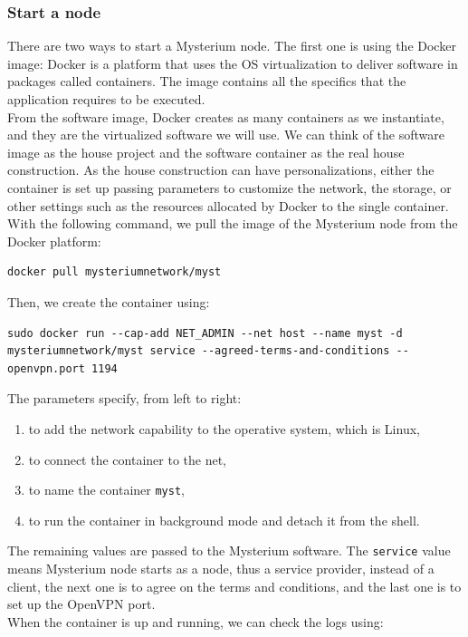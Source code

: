 \documentclass[12pt]{article}
\begin{document}
	\subsubsection{Start a node}
	There are two ways to start a Mysterium node. The first one is using the Docker image: Docker is a platform that uses the OS virtualization to deliver software in packages called containers. The image contains all the specifics that the application requires to be executed.\\
	From the software image, Docker creates as many containers as we instantiate, and they are the virtualized software we will use.  We can think of the software image as the house project and the software container as the real house construction. As the house construction can have personalizations, either the container is set up passing parameters to customize the network, the storage, or other settings such as the resources allocated by Docker to the single container.\\
	\bigbreak
	With the following command, we pull the image of the Mysterium node from the Docker platform:\\
	\bigbreak
	\begin{lstlisting}[frame=single]
		docker pull mysteriumnetwork/myst
	\end{lstlisting}
	
	Then, we create the container using:\\

	\begin{lstlisting}[frame=single]
		sudo docker run --cap-add NET_ADMIN --net host --name myst -d mysteriumnetwork/myst service --agreed-terms-and-conditions --openvpn.port 1194
	\end{lstlisting}

	The parameters specify, from left to right:
	\begin{enumerate}
		\item to add the network capability to the operative system, which is Linux,
		\item to connect the container to the net,
		\item to name the container \lstinline{myst},
		\item to run the container in background mode and detach it from the shell.
	\end{enumerate}

	The remaining values are passed to the Mysterium software. The \lstinline{service} value means Mysterium node starts as a node, thus a service provider, instead of a client, the next one is to agree on the terms and conditions, and the last one is to set up the OpenVPN port.\\
	When the container is up and running, we can check the logs using:
\end{document}
